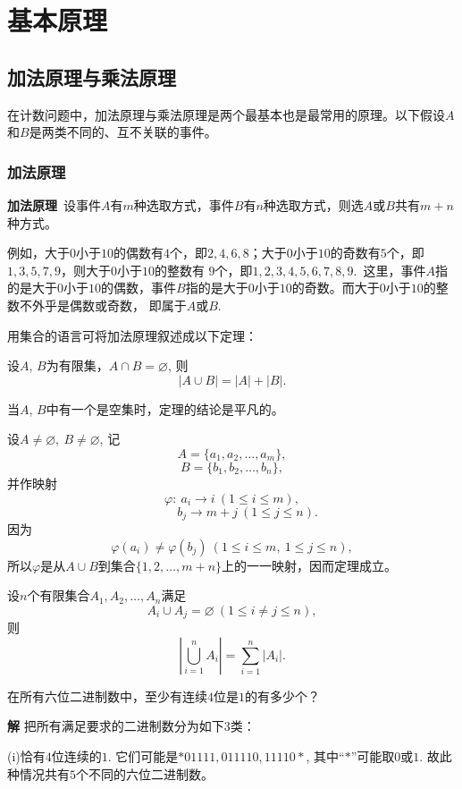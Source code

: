 \chapter{基本原理}
\label{chap1} \minitoc

\section{加法原理与乘法原理}
在计数问题中，加法原理与乘法原理是两个最基本也是最常用的原理。以下假设$A$和$B$是两类不同的、互不关联的事件。
\subsection{加法原理}
\textbf{加法原理}\
设事件$A$有$m$种选取方式，事件$B$有$n$种选取方式，则选$A$或$B$共有$m+n$种方式。

例如，大于$0$小于$10$的偶数有$4$个，即$2,4,6,8$；大于$0$小于$10$的奇数有$5$个，即$1,3,5,7,9$，则大于$0$小于$10$的整数有
$9$个，即$1,2,3,4,5,6,7,8,9.$\
这里，事件$A$指的是大于$0$小于$10$的偶数，事件$B$指的是大于$0$小于$10$的奇数。而大于$0$小于$10$的整数不外乎是偶数或奇数，
即属于$A$或$B$.

用集合的语言可将加法原理叙述成以下定理：
\begin{thm}
设$A$, $B$为有限集，$A\cap B=\varnothing$, 则$$|A\cup B|=|A|+|B|.$$
\end{thm}
\pf 当$A$, $B$中有一个是空集时，定理的结论是平凡的。

设$A\neq \varnothing,\ B\neq \varnothing$, 记$$A=\{a_1, a_2, \ldots,
a_m\},$$
$$B=\{b_1, b_2, \ldots,
b_n\},$$ 并作映射$$\varphi :\ a_i\rightarrow i\ (1\leq i\leq m),$$
$$\ \ \ \ \ \ \ \ \ \ \ b_j\rightarrow m+j\ (1\leq j\leq n).$$
因为$$\varphi(a_i)\neq \varphi (b_j)\ (1\leq i\leq m,\ 1\leq j\leq n
),$$ 所以$\varphi$是从$A\cup
B$到集合$\{1,2,\ldots,m+n\}$上的一一映射，因而定理成立。
\begin{coro}
设$n$个有限集合$A_1,A_2,\ldots,A_n$满足$$A_i\cup A_j=\varnothing\
(1\leq i \neq j\leq n),$$ 则$$|\bigcup_{i=1}^n A_i|=\sum_{i=1}^n
|A_i|.$$
\end{coro}

\begin{exa}
在所有六位二进制数中，至少有连续$4$位是$1$的有多少个？
\end{exa}

\textbf{解} 把所有满足要求的二进制数分为如下$3$类：

(i)恰有$4$位连续的$1$. 它们可能是$*01111, 011110, 11110*$,
其中“$*$”可能取$0$或$1$. 故此种情况共有$5$个不同的六位二进制数。

